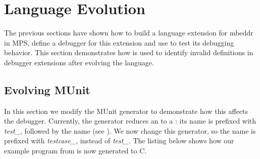 \section{Language Evolution}

The previous sections have shown how to build a language extension for mbeddr in
\ac{MPS}, define a debugger for this extension and use  to test its
debugging behavior.
This section demonstrates how  is used to identify invalid definitions
in debugger extensions after evolving the language.

\subsection{Evolving MUnit}

In this section we modify the MUnit generator to demonstrate how this affects
the debugger. Currently, the generator reduces an  to a
: its name is prefixed with \emph{test\_}, 
followed by the  name (see ).
We now change this generator, so the  name is prefixed
with \emph{testcase\_}, instead of \emph{test\_}.
The listing below shows how our example program from  is
now generated to C.

